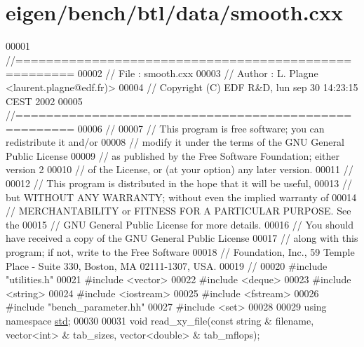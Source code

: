 \hypertarget{eigen_2bench_2btl_2data_2smooth_8cxx_source}{}\section{eigen/bench/btl/data/smooth.cxx}
\label{eigen_2bench_2btl_2data_2smooth_8cxx_source}

\begin{DoxyCode}
00001 \textcolor{comment}{//=====================================================}
00002 \textcolor{comment}{// File   :  smooth.cxx}
00003 \textcolor{comment}{// Author :  L. Plagne <laurent.plagne@edf.fr)>        }
00004 \textcolor{comment}{// Copyright (C) EDF R&D,  lun sep 30 14:23:15 CEST 2002}
00005 \textcolor{comment}{//=====================================================}
00006 \textcolor{comment}{// }
00007 \textcolor{comment}{// This program is free software; you can redistribute it and/or}
00008 \textcolor{comment}{// modify it under the terms of the GNU General Public License}
00009 \textcolor{comment}{// as published by the Free Software Foundation; either version 2}
00010 \textcolor{comment}{// of the License, or (at your option) any later version.}
00011 \textcolor{comment}{// }
00012 \textcolor{comment}{// This program is distributed in the hope that it will be useful,}
00013 \textcolor{comment}{// but WITHOUT ANY WARRANTY; without even the implied warranty of}
00014 \textcolor{comment}{// MERCHANTABILITY or FITNESS FOR A PARTICULAR PURPOSE.  See the}
00015 \textcolor{comment}{// GNU General Public License for more details.}
00016 \textcolor{comment}{// You should have received a copy of the GNU General Public License}
00017 \textcolor{comment}{// along with this program; if not, write to the Free Software}
00018 \textcolor{comment}{// Foundation, Inc., 59 Temple Place - Suite 330, Boston, MA  02111-1307, USA.}
00019 \textcolor{comment}{// }
00020 \textcolor{preprocessor}{#include "utilities.h"}
00021 \textcolor{preprocessor}{#include <vector>}
00022 \textcolor{preprocessor}{#include <deque>}
00023 \textcolor{preprocessor}{#include <string>}
00024 \textcolor{preprocessor}{#include <iostream>}
00025 \textcolor{preprocessor}{#include <fstream>}
00026 \textcolor{preprocessor}{#include "bench\_parameter.hh"}
00027 \textcolor{preprocessor}{#include <set>}
00028 
00029 \textcolor{keyword}{using namespace }\hyperlink{namespacestd}{std};
00030 
00031 \textcolor{keywordtype}{void} read\_xy\_file(\textcolor{keyword}{const} \textcolor{keywordtype}{string} & filename, vector<int> & tab\_sizes, vector<double> & tab\_mflops);

\end{DoxyCode}

